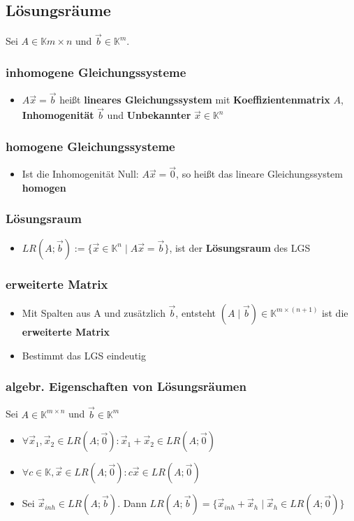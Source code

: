 \documentclass[titlepage]{article}
\newcommand{\K}{\mathbb{K}}
\newcommand{\1}{\mathbb{1}}
\newcommand{\0}{\mathbb{0}}
\begin{document}
			\subsection{Lösungsräume}
				Sei $A\in\K{m\times n}$ und $\vec{b}\in\K^m$.
				\subsubsection{inhomogene Gleichungssysteme}
					\begin{itemize}
						\item $A\vec{x}=\vec{b}$ heißt \textbf{lineares Gleichungssystem} mit \textbf{Koeffizientenmatrix} $A$, \textbf{Inhomogenität} $\vec{b}$ und \textbf{Unbekannter} $\vec{x}\in\K^n$
					\end{itemize}
				\subsubsection{homogene Gleichungssysteme}
					\begin{itemize}
						\item Ist die Inhomogenität Null: $A\vec{x}=\vec{0}$, so heißt das lineare Gleichungssystem \textbf{homogen}
					\end{itemize}
				\subsubsection{Lösungsraum}
					\begin{itemize}
						\item $LR(A;\vec{b}):=\{\vec{x}\in\K^n\mid A\vec{x}=\vec{b}\}$, ist der \textbf{Lösungsraum} des LGS
					\end{itemize}
				\subsubsection{erweiterte Matrix}
					\begin{itemize}
						\item Mit Spalten aus A und zusätzlich $\vec{b}$, entsteht $(A\mid\vec{b})\in\K^{m\times(n+1)}$ ist die \textbf{erweiterte Matrix}
						\item Bestimmt das LGS eindeutig
					\end{itemize}
				\subsubsection{algebr. Eigenschaften von Lösungsräumen}
					Sei $A\in\K^{m\times n}$ und $\vec{b}\in\K^m$
					\begin{itemize}
						\item $\forall \vec{x}_1,\vec{x}_2\in LR(A;\vec{0}):\vec{x}_1+\vec{x}_2\in LR(A;\vec{0})$
						\item $\forall c\in\K,\vec{x}\in LR(A;\vec{0}):c\vec{x}\in LR(A;\vec{0})$
						\item Sei $\vec{x}_{inh}\in LR(A;\vec{b})$. Dann $LR(A;\vec{b})=\{\vec{x}_{inh}+\vec{x}_h\mid\vec{x}_h\in LR(A;\vec{0})\}$
					\end{itemize}
\end{document}
